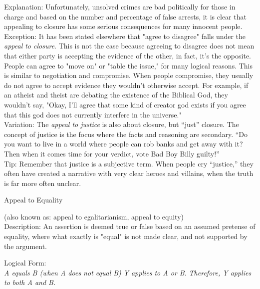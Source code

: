 \documentclass[a4paper,12pt,single,pdftex]{scrartcl}
\begin{document}
{    
      Explanation: Unfortunately, unsolved crimes are bad politically for those in charge and based on the number and percentage of false arrests, it is clear that appealing to closure has some serious consequences for many innocent people.
    \\

    
      Exception: It has been stated elsewhere that "agree to disagree" falls under the {\it appeal to closure}. This is not the case because agreeing to disagree does not mean that either party is accepting the evidence of the other, in fact, it's the opposite. People can agree to "move on" or "table the issue," for many logical reasons. This is similar to negotiation and compromise. When people compromise, they usually do not agree to accept evidence they wouldn't otherwise accept. For example, if an atheist and theist are debating the existence of the Biblical God, they wouldn't say, "Okay, I'll agree that some kind of creator god exists if you agree that this god does not currently interfere in the universe."
    \\

    
      Variation: The {\em appeal to justice} is also about closure, but “just” closure. The concept of justice is the focus where the facts and reasoning are secondary. “Do you want to live in a world where people can rob banks and get away with it? Then when it comes time for your verdict, vote Bad Boy Billy guilty!”
    \\

    
      Tip: Remember that justice is a subjective term. When people cry “justice,” they often have created a narrative with very clear heroes and villains, when the truth is far more often unclear.
    \\

  }


Appeal to Equality
    
      (also known as: appeal to egalitarianism, appeal to equity)
    \\

  
    Description: An assertion is deemed true or false based on an assumed pretense of equality, where what exactly is "equal" is not made clear, and not supported by the argument.

    
      Logical Form:
    \\

    
      {\em A equals B (when A does not equal B)} \newline
{\em Y applies to A or B.} \newline
{\em Therefore, Y applies to both A and B.}
    \\
\end{document}
